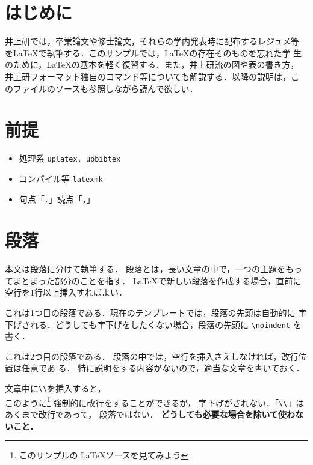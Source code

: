 \documentclass[uplatex]{jsarticle}
\begin{document}
\vspace{3mm}


\section{はじめに}

井上研では，卒業論文や修士論文，それらの学内発表時に配布するレジュメ等
を\LaTeX で執筆する．このサンプルでは，\LaTeX の存在そのものを忘れた学
生のために，\LaTeX の基本を軽く復習する．また，井上研流の図や表の書き方，
井上研フォーマット独自のコマンド等についても解説する．以降の説明は，こ
のファイルのソースも参照しながら読んで欲しい．

\section{前提}

\begin{itemize}
\item 処理系 \texttt{uplatex, upbibtex}
\item コンパイル等 \texttt{latexmk}
\item 句点「．」読点「，」
\end{itemize}

\section{段落}

本文は段落に分けて執筆する．
段落とは，長い文章の中で，一つの主題をもってまとまった部分のことを指す．
\LaTeX で新しい段落を作成する場合，直前に空行を1行以上挿入すればよい．

これは1つ目の段落である．現在のテンプレートでは，段落の先頭は自動的に
字下げされる．どうしても字下げをしたくない場合，段落の先頭に
\verb|\noindent| を書く．


これは2つ目の段落である．
段落の中では，空行を挿入さえしなければ，改行位置は任意であ
る．
特に説明をする内容がないので，適当な文章を書いておく．

文章中に\verb|\\|を挿入すると，\\
このように\footnote{このサンプルの \LaTeX ソースを見てみよう}
強制的に改行をすることができるが，
字下げがされない．「\verb|\\|」はあくまで改行であって，
段落ではない．
\textbf{どうしても必要な場合を除いて使わないこと．}
\end{document}
